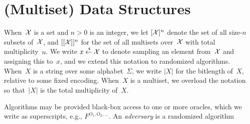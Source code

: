 \section{(Multiset) Data Structures}

 When~${\cal X}$ is a set and $n>0$ is an
integer, we let $[{\cal X}]^n$ denote the set of all size-$n$ subsets
of~${\cal X}$, and $[[{\cal X}]]^n$ for the set of all multisets
over~${\cal X}$ with total multiplicity~$n$. We write $x {\:\stackrel{{\scriptscriptstyle \hspace{0.2em}\$}} {\leftarrow}\:} {\cal X}$ to denote
sampling an element from~${\cal X}$ and assigning this to~$x$, and we
extend this notation to randomized algorithms.  When~$X$ is a string
over some alphabet~$\Sigma$, we write $|X|$ for the bitlength
of~$X$, relative to some fixed encoding.  When~$X$ is a multiset, we
overload the notation so that~$|X|$ is the total multiplicity of~$X$.

Algorithms may be provided black-box access to one or more oracles, which we write as superscripts, e.g., $F^{O_1,O_2,\ldots}$.  An \emph{adversary} is a randomized algorithm


